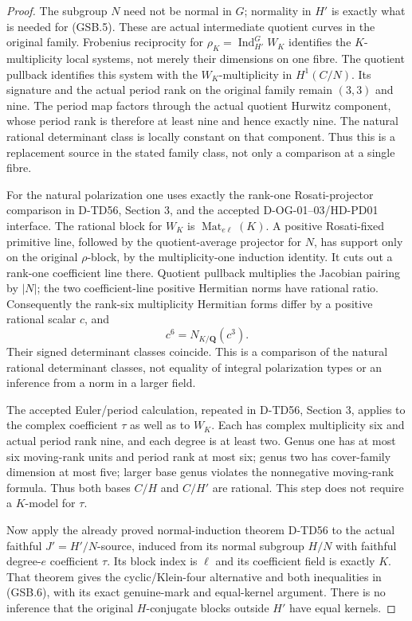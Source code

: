 \begin{proof}
The subgroup \(N\) need not be normal in \(G\); normality in
\(H'\) is exactly what is needed for (GSB.5). These are actual
intermediate quotient curves in the original family. Frobenius
reciprocity for \(\rho_K=\operatorname{Ind}_{H'}^G W_K\) identifies
the \(K\)-multiplicity local systems, not merely their dimensions
on one fibre. The quotient pullback identifies this system with
the \(W_K\)-multiplicity in \(H^1(C/N)\). Its signature and the
actual period rank on the original family remain \((3,3)\) and nine.
The period map factors through the actual quotient Hurwitz component,
whose period rank is therefore at least nine and hence exactly nine.
The natural rational determinant class is locally constant on that
component. Thus this is a replacement source in the stated family
class, not only a comparison at a single fibre.

For the natural polarization one uses exactly the rank-one
Rosati-projector comparison in D-TD56, Section 3, and the accepted
D-OG-01--03/HD-PD01 interface. The rational block for \(W_K\) is
\(\operatorname{Mat}_{e\ell}(K)\). A positive Rosati-fixed primitive
line, followed by the quotient-average projector for \(N\), has
support only on the original \(\rho\)-block, by the multiplicity-one
induction identity. It cuts out a rank-one coefficient line there.
Quotient pullback multiplies the Jacobian pairing by \(|N|\);
the two coefficient-line positive Hermitian norms have rational
ratio. Consequently the rank-six multiplicity Hermitian forms
differ by a positive rational scalar \(c\), and
\[
                  c^6=N_{K/\mathbf Q}(c^3).
 \tag{GSB.11}
\]
Their signed determinant classes coincide. This is a comparison of
the natural rational determinant classes, not equality of integral
polarization types or an inference from a norm in a larger field.

The accepted Euler/period calculation, repeated in D-TD56, Section 3,
applies to the complex coefficient \(\tau\) as well as to \(W_K\).
Each has complex multiplicity six and actual period rank nine, and
each degree is at least two. Genus one has at most six moving-rank
units and period rank at most six; genus two has cover-family
dimension at most five; larger base genus violates the nonnegative
moving-rank formula. Thus both bases \(C/H\) and \(C/H'\) are rational.
This step does not require a \(K\)-model for \(\tau\).

Now apply the already proved normal-induction theorem D-TD56 to
the actual faithful \(J'=H'/N\)-source, induced from its normal
subgroup \(H/N\) with faithful degree-\(e\) coefficient \(\tau\).
Its block index is \(\ell\) and its coefficient field is exactly
\(K\). That theorem gives the cyclic/Klein-four alternative and
both inequalities in (GSB.6), with its exact genuine-mark and
equal-kernel argument. There is no inference that the original
\(H\)-conjugate blocks outside \(H'\) have equal kernels.


\end{proof}

